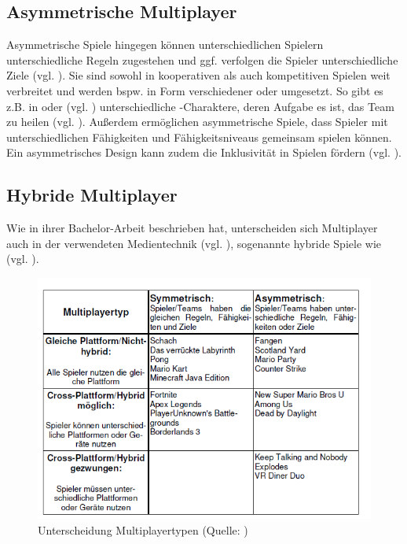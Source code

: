\subsection{Asymmetrische Multiplayer}
Asymmetrische Spiele hingegen können unterschiedlichen Spielern unterschiedliche Regeln zugestehen und ggf. verfolgen die Spieler unterschiedliche Ziele (vgl. \citealp[S. 13]{adams_fundamentals_2009}). Sie sind sowohl in kooperativen als auch kompetitiven Spielen weit verbreitet und werden bspw. in Form verschiedener  oder  umgesetzt. So gibt es z.B. in  oder  (vgl. \citealp{riot_games_league_2009, blizzard_entertainment_overwatch_2023}) unterschiedliche -Charaktere, deren Aufgabe es ist, das Team zu heilen (vgl. \citealp[S. 307f]{smilovitch_birdquestvr_2019}).
Außerdem ermöglichen asymmetrische Spiele, dass Spieler mit unterschiedlichen Fähigkeiten und Fähigkeitsniveaus gemeinsam spielen können. Ein asymmetrisches Design kann zudem die Inklusivität in Spielen fördern (vgl. \citealp[S. 308]{smilovitch_birdquestvr_2019}).

\subsection{Hybride Multiplayer}\label{sec:hybrid-multiplayer}
Wie \citeauthor{lotz_konzeption_2021} in ihrer Bachelor-Arbeit beschrieben hat, unterscheiden sich Multiplayer auch in der verwendeten Medientechnik (vgl. \citealp[S. 6f]{lotz_konzeption_2021}), sogenannte hybride Spiele wie  (vgl. \citealp{nintendo_mario_2012}).

\begin{figure}[ht]
\centering
\includegraphics[width=1\linewidth]{content/pictures/lotz_hybrid_multiplayer.PNG}
\caption{Unterscheidung Multiplayertypen (Quelle: \citealp[S.6]{lotz_konzeption_2021})}
\label{fig:lotz_multiplayer_types}
\end{figure}

